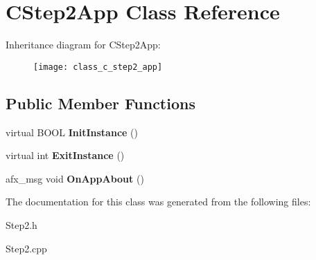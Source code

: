 \hypertarget{class_c_step2_app}{}\section{C\+Step2\+App Class Reference}
\label{class_c_step2_app}
Inheritance diagram for C\+Step2\+App\+:\begin{figure}[H]
\begin{center}
\leavevmode
\texttt{[image: class\_c\_step2\_app]}
\end{center}
\end{figure}
\subsection*{Public Member Functions}
\begin{DoxyCompactItemize}
\item 
\mbox{\label{class_c_step2_app_a4152bf861e6e520eaa173c41a3d9f73d}} 
virtual B\+O\+OL {\bfseries Init\+Instance} ()
\item 
\mbox{\label{class_c_step2_app_aad455705e63bb9ae0642be6ca2d2b684}} 
virtual int {\bfseries Exit\+Instance} ()
\item 
\mbox{\label{class_c_step2_app_a7407f02b1d0628458512c9f35ab2bb50}} 
afx\+\_\+msg void {\bfseries On\+App\+About} ()
\end{DoxyCompactItemize}


The documentation for this class was generated from the following files\+:\begin{DoxyCompactItemize}
\item 
Step2.\+h\item 
Step2.\+cpp\end{DoxyCompactItemize}
